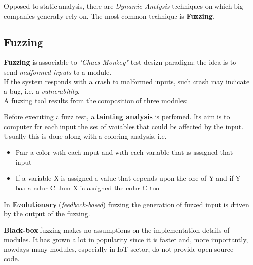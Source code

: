 Opposed to static analysis, there are \textit{Dynamic Analysis} techniques on which big companies generally rely on.
The most common technique is \textbf{Fuzzing}.

\subsection{Fuzzing}
\textbf{Fuzzing} is associable to \textit{"Chaos Monkey"} test design paradigm:
the idea is to send \textit{malformed inputs} to a module.\\
If the system responds with a crash to malformed inputs, such crash may indicate a bug, i.e. a \textit{vulnerability}.\\
A fuzzing tool results from the composition of three modules:
\begin{center}
\end{center}

Before executing a fuzz test, a \textbf{tainting analysis} is perfomed.
Its aim is to computer for each input the set of variables that could be affected by the input.
Usually this is done along with a coloring analysis, i.e. 
\begin{itemize}
    \item Pair a color with each input and with each variable that is assigned that input
    \item If a variable X is assigned a value that depends upon the one of Y and if
    Y has a color C then X is assigned the color C too
\end{itemize}

In \textbf{Evolutionary} (\textit{feedback-based}) fuzzing the generation of fuzzed input is driven by the output of the fuzzing.

\textbf{Black-box} fuzzing makes no assumptions on the implementation details of modules.
It has grown a lot in popularity since it is faster and, more importantly, nowdays many modules, especially in IoT sector, do not provide open source code.
\nl

